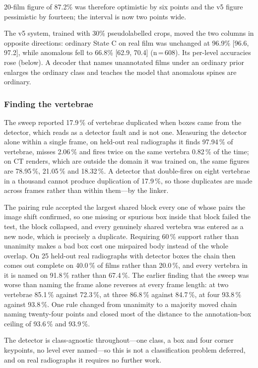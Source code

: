 \documentclass[11pt,letterpaper]{article}
\newcommand{\ci}[2]{[#1, #2]}
\begin{document}
20-film figure of 87.2\% was therefore optimistic by six points and the v5 figure pessimistic by fourteen; the interval is now two points wide.

The v5 system, trained with 30\% pseudolabelled crops, moved the two columns in opposite directions: ordinary State C on real film was unchanged at 96.9\% \ci{96.6}{97.2}, while anomalous fell to 66.8\% \ci{62.9}{70.4} (n\,=\,608). Its per-level accuracies rose (below). A decoder that names unannotated films under an ordinary prior enlarges the ordinary class and teaches the model that anomalous spines are ordinary.


\subsubsection*{Finding the vertebrae}
The sweep reported 17.9\,\% of vertebrae duplicated when boxes came from the detector, which reads as a detector fault and is not one. Measuring the detector alone within a single frame, on held-out real radiographs it finds 97.94\,\% of vertebrae, misses 2.06\,\% and fires twice on the same vertebra 0.82\,\% of the time; on CT renders, which are outside the domain it was trained on, the same figures are 78.95\,\%, 21.05\,\% and 18.32\,\%. A detector that double-fires on eight vertebrae in a thousand cannot produce duplication of 17.9\,\%, so those duplicates are made across frames rather than within them---by the linker.

The pairing rule accepted the largest shared block every one of whose pairs the image shift confirmed, so one missing or spurious box inside that block failed the test, the block collapsed, and every genuinely shared vertebra was entered as a new node, which is precisely a duplicate. Requiring 60\,\% support rather than unanimity makes a bad box cost one mispaired body instead of the whole overlap. On 25 held-out real radiographs with detector boxes the chain then comes out complete on 40.0\,\% of films rather than 20.0\,\%, and every vertebra in it is named on 91.8\,\% rather than 67.4\,\%. The earlier finding that the sweep was worse than naming the frame alone reverses at every frame length: at two vertebrae 85.1\,\% against 72.3\,\%, at three 86.8\,\% against 84.7\,\%, at four 93.8\,\% against 93.8\,\%. One rule changed from unanimity to a majority moved chain naming twenty-four points and closed most of the distance to the annotation-box ceiling of 93.6\,\% and 93.9\,\%.

The detector is class-agnostic throughout---one class, a box and four corner keypoints, no level ever named---so this is not a classification problem deferred, and on real radiographs it requires no further work.
\end{document}
